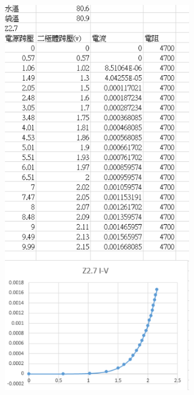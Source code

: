\documentclass[UTF8]{ctexart}
\begin{document}
\begin{CJK*}{UTF8}{song}
\begin{minipage}[t]{0.48\textwidth}
\end{minipage}
 \\

\begin{minipage}[t]{0.48\textwidth}
\centering
\includegraphics[width = 0.6\textwidth]{80z27.png}
\end{minipage}
\begin{minipage}[t]{0.48\textwidth}
\centering

\end{minipage}
\end{CJK*}
\end{document}
